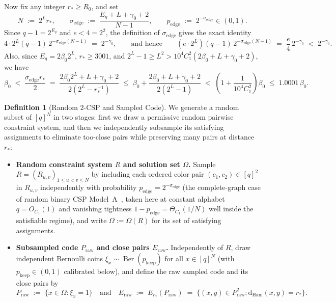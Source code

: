 \documentclass[11pt]{article}
\theoremstyle{definition}
\newtheorem*{definition*}{Definition}
\theoremstyle{remark}
\newcommand{\Ham}{\mathrm{Ham}}
\newcommand{\dHam}{\mathrm{d}_{\Ham}}
\newcommand{\Ber}{\operatorname{Ber}}
\begin{document}
Now fix any integer $r_* \ge R_0$, and set
\[
N \;:=\; 2^L r_*, \qquad \sigma_{\mathrm{edge}} \;:=\; \frac{E_q + L + \gamma_0 + 2}{N - 1}, \qquad p_{\mathrm{edge}} \;:=\; 2^{-\sigma_{\mathrm{edge}}} \in (0, 1).
\]
Since $q - 1 = 2^{E_q}$ and $e < 4 = 2^2$, the definition of $\sigma_{\mathrm{edge}}$ gives the exact identity
\begin{equation}
\label{eq:exact-calibration}
4 \cdot 2^L (q - 1)\,2^{-\sigma_{\mathrm{edge}}(N - 1)} \;=\; 2^{-\gamma_0}, \qquad \text{and hence} \qquad (e \cdot 2^L)(q - 1)\,2^{-\sigma_{\mathrm{edge}}(N - 1)} \;=\; \frac{e}{4}\,2^{-\gamma_0} \;<\; 2^{-\gamma_0}.
\end{equation}
Also, since $E_q = 2 \beta_0 2^L$, $r_* \ge 3001$, and $2^L - 1 \ge L^2 > 10^4 C_1^2 (2\beta_0 + L + \gamma_0 + 2)$, we have
\begin{equation}
\label{eq:sigma-window}
\beta_0 \;<\; \frac{\sigma_{\mathrm{edge}} r_*}{2} \;=\; \frac{2\beta_0 2^L + L + \gamma_0 + 2}{2(2^L - r_*^{-1})} \;\le\; \beta_0 + \frac{2\beta_0 + L + \gamma_0 + 2}{2(2^L - 1)} \;<\; \left(1 + \frac{1}{10^4 C_1^2}\right)\beta_0 \;\le\; 1.0001\,\beta_0.
\end{equation}

\begin{definition*}[Random $2$-CSP and Sampled Code]
We generate a random subset of $[q]^N$ in two stages: first we draw a permissive random pairwise constraint system, and then we independently subsample its satisfying assignments to eliminate too-close pairs while preserving many pairs at distance $r_*$:
\begin{itemize}[leftmargin=2em,nosep,topsep=4pt,itemsep=3pt]
  \item \textbf{Random constraint system $R$ and solution set $\Omega$.} Sample $R = (R_{u, v})_{1 \le u < v \le N}$ by including each ordered color pair $(c_1, c_2) \in [q]^2$ in $R_{u, v}$ independently with probability $p_{\mathrm{edge}} = 2^{-\sigma_{\mathrm{edge}}}$ (the complete-graph case of random binary CSP Model~A~\cite{achlioptas2001random,molloy2003models,frieze2006satisfiability}, taken here at constant alphabet $q = O_{C_1}(1)$ and vanishing tightness $1 - p_{\mathrm{edge}} = \Theta_{C_1}(1/N)$ well inside the satisfiable regime), and write $\Omega := \Omega(R)$ for its set of satisfying assignments.
  \item \textbf{Subsampled code $P_{\mathrm{raw}}$ and close pairs $E_{\mathrm{raw}}$.} Independently of $R$, draw independent Bernoulli coins $\xi_x \sim \Ber(p_{\mathrm{keep}})$ for all $x \in [q]^N$ (with $p_{\mathrm{keep}} \in (0, 1)$ calibrated below), and define the raw sampled code and its close pairs by
  \[
  P_{\mathrm{raw}} \;:=\; \{x \in \Omega : \xi_x = 1\} \quad \text{and} \quad E_{\mathrm{raw}} \;:=\; E_{r_*}(P_{\mathrm{raw}}) \;=\; \{(x, y) \in P_{\mathrm{raw}}^2 : \dHam(x, y) = r_*\}.
  \]
\end{itemize}
\end{definition*}
\end{document}

